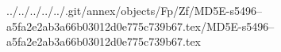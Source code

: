 ../../../../../.git/annex/objects/Fp/Zf/MD5E-s5496--a5fa2e2ab3a66b03012d0e775c739b67.tex/MD5E-s5496--a5fa2e2ab3a66b03012d0e775c739b67.tex